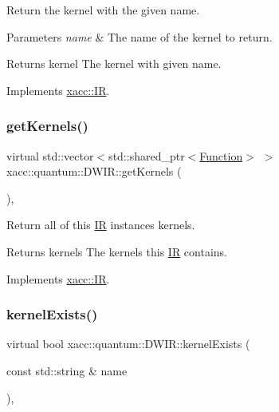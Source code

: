 Return the kernel with the given name.


\begin{DoxyParams}{Parameters}
{\em name} & The name of the kernel to return. \\
\hline
\end{DoxyParams}
\begin{DoxyReturn}{Returns}
kernel The kernel with given name. 
\end{DoxyReturn}


Implements \hyperlink{a01677_a6f49b4ba4b3a15142b04873284885f0d}{xacc\+::\+IR}.

\mbox{\label{a01217_a66e22c5dc95ec46045476864012ad08f}} 
\subsubsection{\texorpdfstring{get\+Kernels()}{getKernels()}}
{\footnotesize\ttfamily virtual std\+::vector$<$std\+::shared\+\_\+ptr$<$\hyperlink{a01653}{Function}$>$ $>$ xacc\+::quantum\+::\+D\+W\+I\+R\+::get\+Kernels (\begin{DoxyParamCaption}{ }\end{DoxyParamCaption})\hspace{0.3cm}{\ttfamily [inline]}, {\ttfamily [virtual]}}

Return all of this \hyperlink{a01677}{IR} instance\textquotesingle{}s kernels.

\begin{DoxyReturn}{Returns}
kernels The kernels this \hyperlink{a01677}{IR} contains. 
\end{DoxyReturn}


Implements \hyperlink{a01677_a88c50bfc5b279145360ddc0c3a703b9b}{xacc\+::\+IR}.

\mbox{\label{a01217_ab5e8861d3bc0845bb015af6208f5f396}} 
\subsubsection{\texorpdfstring{kernel\+Exists()}{kernelExists()}}
{\footnotesize\ttfamily virtual bool xacc\+::quantum\+::\+D\+W\+I\+R\+::kernel\+Exists (\begin{DoxyParamCaption}\item[{const std\+::string \&}]{name }\end{DoxyParamCaption})\hspace{0.3cm}{\ttfamily [inline]}, {\ttfamily [virtual]}}


